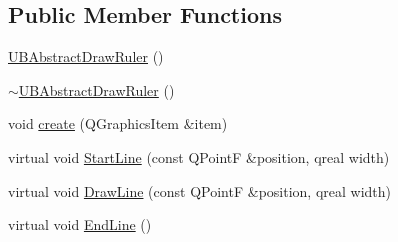\subsection*{Public Member Functions}
\begin{DoxyCompactItemize}
\item 
\hyperlink{class_u_b_abstract_draw_ruler_a6f99fdef144a55e29b3778c5c15b58ee}{U\-B\-Abstract\-Draw\-Ruler} ()
\item 
\hyperlink{class_u_b_abstract_draw_ruler_abd3dfbb73b6f654fd12dfabbf4efdf02}{$\sim$\-U\-B\-Abstract\-Draw\-Ruler} ()
\item 
void \hyperlink{class_u_b_abstract_draw_ruler_a24501e936a1663e81603fad843d9745d}{create} (Q\-Graphics\-Item \&item)
\item 
virtual void \hyperlink{class_u_b_abstract_draw_ruler_a62b7651d1eed188e2160343d078a837c}{Start\-Line} (const Q\-Point\-F \&position, qreal width)
\item 
virtual void \hyperlink{class_u_b_abstract_draw_ruler_a1995cacf2e94402170f4e094f3d752cc}{Draw\-Line} (const Q\-Point\-F \&position, qreal width)
\item 
virtual void \hyperlink{class_u_b_abstract_draw_ruler_a8e1a28d6c4c93785ca2cee613ce04435}{End\-Line} ()
\end{DoxyCompactItemize}
